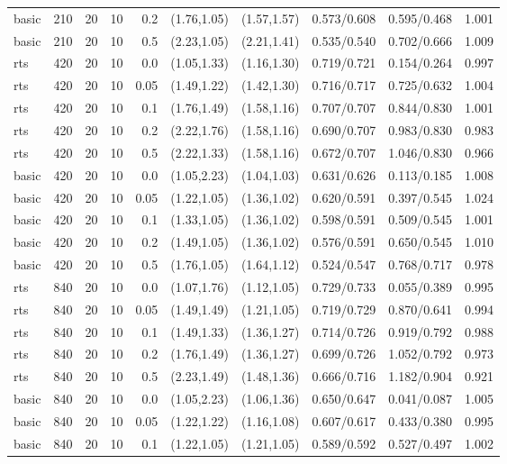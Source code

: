 \begin{tabular}{llrrrccccc}
basic & 210 & 20 & 10 & 0.2 & (1.76,1.05) & (1.57,1.57) & 0.573/0.608 & 0.595/0.468 & 1.001 \\
basic & 210 & 20 & 10 & 0.5 & (2.23,1.05) & (2.21,1.41) & 0.535/0.540 & 0.702/0.666 & 1.009 \\
rts & 420 & 20 & 10 & 0.0 & (1.05,1.33) & (1.16,1.30) & 0.719/0.721 & 0.154/0.264 & 0.997 \\
rts & 420 & 20 & 10 & 0.05 & (1.49,1.22) & (1.42,1.30) & 0.716/0.717 & 0.725/0.632 & 1.004 \\
rts & 420 & 20 & 10 & 0.1 & (1.76,1.49) & (1.58,1.16) & 0.707/0.707 & 0.844/0.830 & 1.001 \\
rts & 420 & 20 & 10 & 0.2 & (2.22,1.76) & (1.58,1.16) & 0.690/0.707 & 0.983/0.830 & 0.983 \\
rts & 420 & 20 & 10 & 0.5 & (2.22,1.33) & (1.58,1.16) & 0.672/0.707 & 1.046/0.830 & 0.966 \\
basic & 420 & 20 & 10 & 0.0 & (1.05,2.23) & (1.04,1.03) & 0.631/0.626 & 0.113/0.185 & 1.008 \\
basic & 420 & 20 & 10 & 0.05 & (1.22,1.05) & (1.36,1.02) & 0.620/0.591 & 0.397/0.545 & 1.024 \\
basic & 420 & 20 & 10 & 0.1 & (1.33,1.05) & (1.36,1.02) & 0.598/0.591 & 0.509/0.545 & 1.001 \\
basic & 420 & 20 & 10 & 0.2 & (1.49,1.05) & (1.36,1.02) & 0.576/0.591 & 0.650/0.545 & 1.010 \\
basic & 420 & 20 & 10 & 0.5 & (1.76,1.05) & (1.64,1.12) & 0.524/0.547 & 0.768/0.717 & 0.978 \\
rts & 840 & 20 & 10 & 0.0 & (1.07,1.76) & (1.12,1.05) & 0.729/0.733 & 0.055/0.389 & 0.995 \\
rts & 840 & 20 & 10 & 0.05 & (1.49,1.49) & (1.21,1.05) & 0.719/0.729 & 0.870/0.641 & 0.994 \\
rts & 840 & 20 & 10 & 0.1 & (1.49,1.33) & (1.36,1.27) & 0.714/0.726 & 0.919/0.792 & 0.988 \\
rts & 840 & 20 & 10 & 0.2 & (1.76,1.49) & (1.36,1.27) & 0.699/0.726 & 1.052/0.792 & 0.973 \\
rts & 840 & 20 & 10 & 0.5 & (2.23,1.49) & (1.48,1.36) & 0.666/0.716 & 1.182/0.904 & 0.921 \\
basic & 840 & 20 & 10 & 0.0 & (1.05,2.23) & (1.06,1.36) & 0.650/0.647 & 0.041/0.087 & 1.005 \\
basic & 840 & 20 & 10 & 0.05 & (1.22,1.22) & (1.16,1.08) & 0.607/0.617 & 0.433/0.380 & 0.995 \\
basic & 840 & 20 & 10 & 0.1 & (1.22,1.05) & (1.21,1.05) & 0.589/0.592 & 0.527/0.497 & 1.002 \\

\end{tabular}
